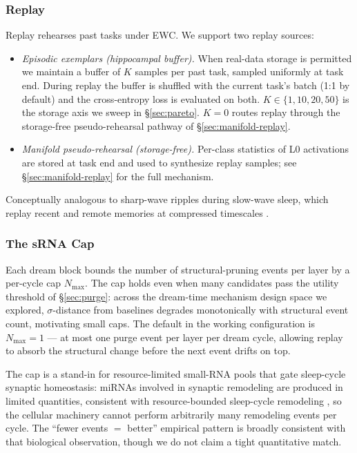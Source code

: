 \documentclass[11pt]{article}
\begin{document}
\subsubsection{Replay}
\label{sec:replay}

Replay rehearses past tasks under EWC. We support two replay sources:
\begin{itemize}[leftmargin=1.5em]
  \item \emph{Episodic exemplars (hippocampal buffer).} When real-data
        storage is permitted we maintain a buffer of $K$ samples per
        past task, sampled uniformly at task end. During replay the
        buffer is shuffled with the current task's batch (1{:}1 by
        default) and the cross-entropy loss is evaluated on both.
        $K \in \{1, 10, 20, 50\}$ is the storage axis we sweep in
        \S\ref{sec:pareto}. $K = 0$ routes replay through the
        storage-free pseudo-rehearsal pathway of
        \S\ref{sec:manifold-replay}.
  \item \emph{Manifold pseudo-rehearsal (storage-free).} Per-class
        statistics of L0 activations are stored at task end and used
        to synthesize replay samples; see \S\ref{sec:manifold-replay}
        for the full mechanism.
\end{itemize}
Conceptually analogous to sharp-wave ripples during slow-wave sleep,
which replay recent and remote memories at compressed timescales
\citep{tononi2014sleep}.

\subsubsection{The sRNA Cap}
\label{sec:srna-cap}

Each dream block bounds the number of structural-pruning events per
layer by a per-cycle cap $N_{\max}$. The cap holds even when many
candidates pass the utility threshold of \S\ref{sec:purge}: across the
dream-time mechanism design space we explored, $\sigma$-distance from
baselines degrades monotonically with structural event count,
motivating small caps. The default in the working configuration is
$N_{\max} = 1$ --- at most one purge event per layer per dream cycle,
allowing replay to absorb the structural change before the next event
drifts on top.

The cap is a stand-in for resource-limited small-RNA pools that gate
sleep-cycle synaptic homeostasis: miRNAs involved in synaptic
remodeling are produced in limited quantities, consistent with
resource-bounded sleep-cycle remodeling
\citep{schratt2009micrornas, tononi2014sleep}, so the cellular
machinery cannot perform arbitrarily many remodeling events per
cycle. The ``fewer events $=$ better'' empirical pattern is
broadly consistent with that biological observation, though we do not
claim a tight quantitative match.
\end{document}
